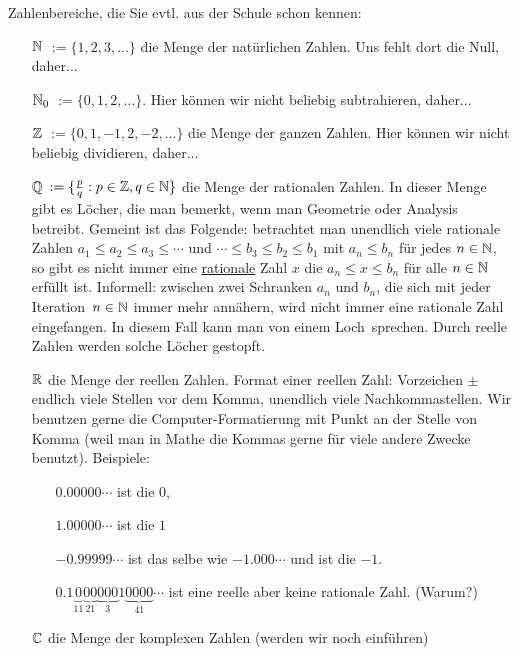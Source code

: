 \begin{bem}
	Zahlenbereiche, die Sie evtl. aus der Schule schon kennen:
\begin{itemize}
\item[$ \mathbb{N} $] $ := \{ 1,2,3,\ldots \} $ die Menge der natürlichen Zahlen. Uns fehlt dort die Null, daher... 
\item[$ \mathbb{N}_0 $] $ := \{ 0,1,2,\ldots \} $. Hier können wir nicht beliebig subtrahieren, daher... 
\item[$ \mathbb{Z} $] $ := \{ 0,1,-1,2,-2,\ldots \} $ die Menge der ganzen Zahlen. Hier können wir nicht beliebig dividieren, daher...
\item[$ \mathbb{Q} $] $ := \{ \frac{p}{q} : p \in \mathbb{Z}, q \in \mathbb{N} \} $ die Menge der rationalen Zahlen. In dieser Menge gibt es \glqq Löcher\grqq , die man bemerkt, wenn man Geometrie oder Analysis betreibt. Gemeint ist das Folgende: betrachtet man unendlich viele rationale Zahlen $a_1 \le a_2 \le a_3 \le \cdots $ und $ \cdots \le b_3 \le b_2 \le b_1$ mit $a_n \le b_n$ für jedes $n \in \mathbb{N}$, so gibt es nicht immer eine \underline{rationale} Zahl $x$ die $a_n \le x \le b_n$ für alle $n \in \mathbb{N}$ erfüllt ist. Informell: zwischen zwei Schranken $a_n$ und $b_n$, die sich mit jeder \glqq Iteration\grqq\ $n \in \mathbb{N}$ immer mehr annähern, wird nicht immer eine rationale Zahl eingefangen. In diesem Fall kann man von einem \glqq Loch\grqq\ sprechen. Durch reelle Zahlen werden solche Löcher gestopft. 
\item[$ \mathbb{R} $] die Menge der reellen Zahlen. Format einer reellen Zahl: Vorzeichen $\pm$ endlich viele Stellen vor dem Komma, unendlich viele Nachkommastellen. Wir benutzen gerne die Computer-Formatierung mit Punkt an der Stelle von Komma (weil man in Mathe die Kommas gerne für viele andere Zwecke benutzt). Beispiele: 
\begin{itemize}
	\item[] $0{.}00000\cdots$ ist die $0$, 
	\item[] $1{.}00000 \cdots$ ist die $1$ 
	\item[] $-0{.}99999 \cdots$ ist das selbe wie $-1{.}000 \cdots$ und ist die $-1$. 
	\item[] $0{.}1\underbrace{0}_11\underbrace{00}_21 \underbrace{ 000}_3 1 \underbrace{0000}_41 \cdots $ ist eine reelle aber keine rationale Zahl. (Warum?)
\end{itemize} 
	\item[$ \mathbb{C} $] die Menge der komplexen Zahlen (werden wir noch einführen) 
\end{itemize}
\end{bem}

